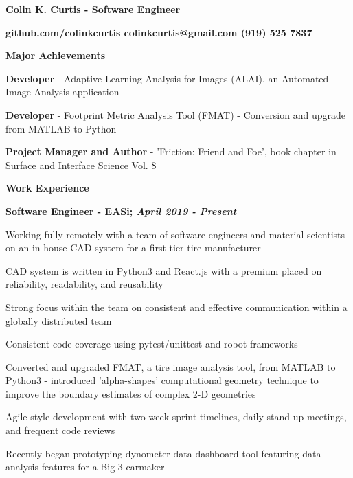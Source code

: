 \documentclass[letterpaper,final]{memoir}
\newcommand{\LargeSep}{\vspace{1.3em}}
\newcommand{\Sep}{\vspace{1.0em}}
\newcommand{\SmallSep}{\vspace{0.4em}}
\newcommand{\CVSection}[1]
	{\LARGE\textbf{#1}\par
	\SmallSep\normalsize}
\newcommand{\CVItem}[1]
	{\textbf{\color{Blue} #1}}
\newcommand\tab[1][1cm]{\hspace*{#1}}
\begin{document}
\Huge \bfseries {\color{Blue} Colin K. Curtis - Software Engineer}

\Sep
\normalsize\normalfont

\CVItem  \tab \bfseries {github.com/colinkcurtis \tab colinkcurtis@gmail.com  \tab  (919) 525 7837}

\LargeSep


\notoserif \CVSection{Major Achievements}
\normalfont

\Sep

\begin{compactitem}

    \item \textbf{Developer} - Adaptive Learning Analysis for Images (ALAI), an Automated Image Analysis application
    \SmallSep

    \item \textbf{Developer} - Footprint Metric Analysis Tool (FMAT) - Conversion and upgrade from MATLAB to Python
    \SmallSep

    \item \textbf{Project Manager and Author} - 'Friction: Friend and Foe', book chapter in Surface and Interface Science Vol. 8


\end{compactitem}
\LargeSep


\notoserif \CVSection{Work Experience}
\normalfont
\Sep
\CVItem{Software Engineer - EASi; \textit{April 2019 - Present}}
\begin{compactitem}[\color{Blue}$\circ$]
    \SmallSep
    \item Working fully remotely with a team of software engineers and material scientists on an in-house CAD system for
    a first-tier tire manufacturer
    \SmallSep
    \item  CAD system is written in Python3 and React.js with a premium placed on reliability, readability, and reusability
    \SmallSep
    \item Strong focus within the team on consistent and effective communication within a globally distributed team
    \SmallSep
    \item Consistent code coverage using pytest/unittest and robot frameworks
    \SmallSep
    \item Converted and upgraded FMAT, a tire image analysis tool, from MATLAB to Python3 - introduced
    \newline
    'alpha-shapes' computational geometry technique to improve the boundary estimates of complex 2-D geometries
    \SmallSep
    \item Agile style development with two-week sprint timelines, daily stand-up meetings, and frequent code reviews
    \SmallSep
    \item Recently began prototyping dynometer-data dashboard tool featuring data analysis features for a Big 3 carmaker
\end{compactitem}
\end{document}
